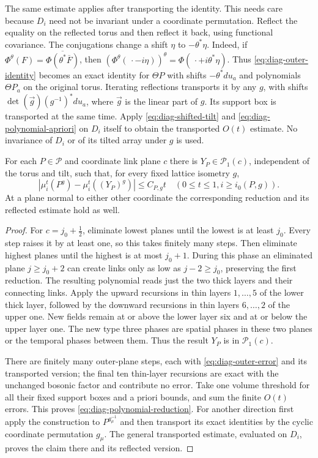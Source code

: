 \documentclass[11pt,letterpaper,reqno]{amsart}
\begin{document}
The same estimate applies after transporting the identity.
This needs care because $D_i$ need not be invariant under
a coordinate permutation. Reflect the equality on the
reflected torus and then reflect it back, using functional
covariance. The conjugations change a shift $\eta$ to
$-\theta^*\eta$. Indeed, if
$\Phi^\theta(F)=\overline{\Phi(\theta^*\overline F)}$, then
$(\Phi^\theta(\,\cdot-i\eta))^\theta=
\Phi(\,\cdot+i\theta^*\eta)$. Thus
\eqref{eq:diag-outer-identity} becomes an exact identity
for $\Theta P$ with shifts $-\theta^*du_a$ and polynomials
$\Theta P_a$ on the original torus. Iterating reflections
transports it by any $g$, with shifts
$\det(\vec g)(g^{-1})^*du_a$, where $\vec g$ is the linear
part of $g$. Its support box is transported at the same time. Apply \eqref{eq:diag-shifted-tilt} and
\eqref{eq:diag-polynomial-apriori} on $D_i$ itself to obtain
the transported $O(t)$ estimate. No invariance of $D_i$
or of its tilted array under $g$ is used.

\begin{proposition}\label{thm:diag-polynomial-reduction}
For each $P\in\mathcal P$ and coordinate link plane $c$ there
is $Y_P\in\mathcal P_1(c)$, independent of the torus and tilt,
such that, for every fixed lattice isometry $g$,
\begin{equation}\label{eq:diag-polynomial-reduction}
 |\mu_i^t(P^g)-\mu_i^t((Y_P)^g)|\le C_{P,g}t
 \quad(0\le t\le1, i\ge i_0(P,g)).
\end{equation}
At a plane normal to either other coordinate the corresponding
reduction and its reflected estimate hold as well.
\end{proposition}

\begin{proof}
For $c=j_0+\tfrac12$, eliminate lowest planes until the
lowest is at least $j_0$. Every step raises it by at least
one, so this takes finitely many steps. Then eliminate
highest planes until the highest is at most $j_0+1$.
During this phase an eliminated plane $j\ge j_0+2$ can
create links only as low as $j-2\ge j_0$, preserving the
first reduction. The resulting polynomial reads just
the two thick layers and their connecting links. Apply
the upward recursions in thin layers $1,\ldots,5$ of
the lower thick layer, followed by the downward recursions
in thin layers $6,\ldots,2$ of the upper one. New fields
remain at or above the lower layer six and at or below
the upper layer one. The new type three phases are
spatial phases in these two planes or the temporal
phases between them. Thus the result $Y_P$ is in
$\mathcal P_1(c)$.

There are finitely many outer-plane steps, each with
\eqref{eq:diag-outer-error} and its transported version;
the final ten thin-layer recursions are exact with the
unchanged bosonic factor and contribute no error. Take
one volume threshold for all their fixed support boxes
and a priori bounds, and sum the finite $O(t)$ errors.
This proves \eqref{eq:diag-polynomial-reduction}.
For another direction first apply the construction to
$P^{g_\mu^{-1}}$ and then transport its exact identities
by the cyclic coordinate permutation $g_\mu$. The general
transported estimate, evaluated on $D_i$, proves the
claim there and its reflected version.
\end{proof}
\end{document}
